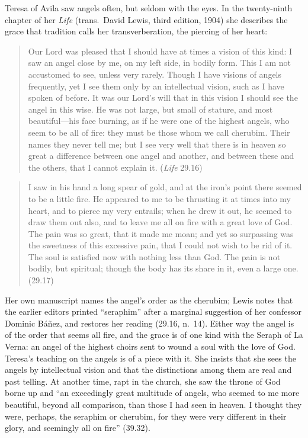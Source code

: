 Teresa of Avila saw angels often, but seldom with the eyes. In the
twenty-ninth chapter of her \emph{Life} (trans.\ David Lewis, third
edition, 1904) she describes the grace that tradition calls her
transverberation, the piercing of her heart:
\begin{quote}
Our Lord was pleased that I should have at times a vision of this kind: I
saw an angel close by me, on my left side, in bodily form. This I am not
accustomed to see, unless very rarely. Though I have visions of angels
frequently, yet I see them only by an intellectual vision, such as I have
spoken of before. It was our Lord's will that in this vision I should see
the angel in this wise. He was not large, but small of stature, and most
beautiful---his face burning, as if he were one of the highest angels, who
seem to be all of fire: they must be those whom we call cherubim. Their
names they never tell me; but I see very well that there is in heaven so
great a difference between one angel and another, and between these and the
others, that I cannot explain it. (\emph{Life} 29.16)
\end{quote}
\begin{quote}
I saw in his hand a long spear of gold, and at the iron's point there seemed
to be a little fire. He appeared to me to be thrusting it at times into my
heart, and to pierce my very entrails; when he drew it out, he seemed to draw
them out also, and to leave me all on fire with a great love of God. The
pain was so great, that it made me moan; and yet so surpassing was the
sweetness of this excessive pain, that I could not wish to be rid of it. The
soul is satisfied now with nothing less than God. The pain is not bodily,
but spiritual; though the body has its share in it, even a large one.
(29.17)
\end{quote}
Her own manuscript names the angel's order as the cherubim; Lewis notes
that the earlier editors printed ``seraphim'' after a marginal suggestion of
her confessor Dominic Báñez, and restores her reading (29.16, n.~14). Either
way the angel is of the order that seems all fire, and the grace is of one
kind with the Seraph of La Verna: an angel of the highest choirs sent to
wound a soul with the love of God. Teresa's teaching on the angels is of a piece
with it. She insists that she sees the angels by intellectual vision and
that the distinctions among them are real and past telling. At another time,
rapt in the church, she saw the throne of God borne up and ``an exceedingly
great multitude of angels, who seemed to me more beautiful, beyond all
comparison, than those I had seen in heaven. I thought they were, perhaps,
the seraphim or cherubim, for they were very different in their glory, and
seemingly all on fire'' (39.32).


